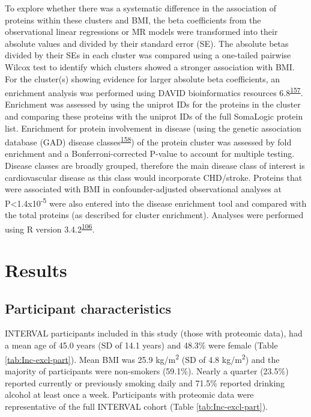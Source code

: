 \documentclass[11pt,twoside]{bristolthesis}
\begin{document}
To explore whether there was a systematic difference in the association of proteins within these clusters and BMI, the beta coefficients from the observational linear regressions or MR models were transformed into their absolute values and divided by their standard error (SE). The absolute betas divided by their SEs in each cluster was compared using a one-tailed pairwise Wilcox test to identify which clusters showed a stronger association with BMI. For the cluster(s) showing evidence for larger absolute beta coefficients, an enrichment analysis was performed using DAVID bioinformatics resources 6.8\textsuperscript{\protect\hyperlink{ref-Huang2009}{157}}. Enrichment was assessed by using the uniprot IDs for the proteins in the cluster and comparing these proteins with the uniprot IDs of the full SomaLogic protein list. Enrichment for protein involvement in disease (using the genetic association database (GAD) disease classes\textsuperscript{\protect\hyperlink{ref-Becker2004a}{158}}) of the protein cluster was assessed by fold enrichment and a Bonferroni-corrected P-value to account for multiple testing. Disease classes are broadly grouped, therefore the main disease class of interest is cardiovascular disease as this class would incorporate CHD/stroke. Proteins that were associated with BMI in confounder-adjusted observational analyses at P\textless1.4x10\textsuperscript{-5} were also entered into the disease enrichment tool and compared with the total proteins (as described for cluster enrichment). Analyses were performed using R version 3.4.2\textsuperscript{\protect\hyperlink{ref-Team2019a}{106}}.

\hypertarget{results-3}{%
\section{Results}\label{results-3}}

\hypertarget{participant-characteristics-1}{%
\subsection{Participant characteristics}\label{participant-characteristics-1}}

INTERVAL participants included in this study (those with proteomic data), had a mean age of 45.0 years (SD of 14.1 years) and 48.3\% were female (Table \ref{tab:Inc-excl-part}). Mean BMI was 25.9 kg/m\textsuperscript{2} (SD of 4.8 kg/m\textsuperscript{2}) and the majority of participants were non-smokers (59.1\%). Nearly a quarter (23.5\%) reported currently or previously smoking daily and 71.5\% reported drinking alcohol at least once a week. Participants with proteomic data were representative of the full INTERVAL cohort (Table \ref{tab:Inc-excl-part}).
\end{document}
